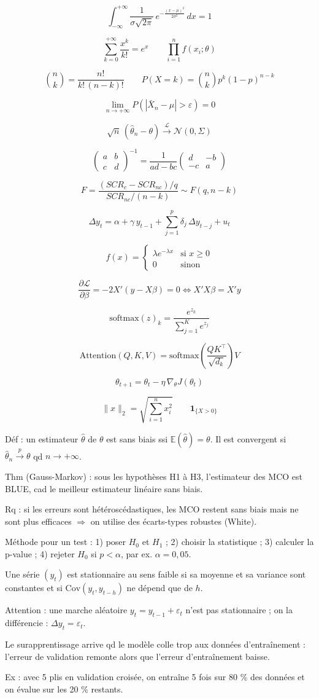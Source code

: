 \documentclass[11pt]{article}
\makeatletter
\newcommand{\aecrire}[1]{\par\noindent\begin{minipage}{\linewidth}\raggedright #1\end{minipage}\par\vspace{2pt}{\color{fiche@roseclair}\rule{\linewidth}{.6pt}}\par\vspace{5pt}}
\makeatother
\begin{document}
\aecrire{\[ \int_{-\infty}^{+\infty} \frac{1}{\sigma\sqrt{2\pi}}\, e^{-\frac{(x-\mu)^2}{2\sigma^2}}\, dx = 1 \]}
\aecrire{\[ \sum_{k=0}^{+\infty} \frac{x^k}{k!} = e^x \qquad \prod_{i=1}^{n} f(x_i ; \theta) \]}
\aecrire{\[ \binom{n}{k} = \frac{n!}{k!\,(n-k)!} \qquad P(X = k) = \binom{n}{k} p^k (1-p)^{n-k} \]}
\aecrire{\[ \lim_{n \to +\infty} P\left(|\bar{X}_n - \mu| > \varepsilon\right) = 0 \]}
\aecrire{\[ \sqrt{n}\,(\hat{\theta}_n - \theta) \xrightarrow{\mathcal{L}} \mathcal{N}(0, \Sigma) \]}
\aecrire{\[ \begin{pmatrix} a & b \\ c & d \end{pmatrix}^{-1} = \frac{1}{ad - bc} \begin{pmatrix} d & -b \\ -c & a \end{pmatrix} \]}
\aecrire{\[ F = \frac{(SCR_c - SCR_{nc})/q}{SCR_{nc}/(n-k)} \sim F(q, n-k) \]}
\aecrire{\[ \Delta y_t = \alpha + \gamma\, y_{t-1} + \sum_{j=1}^{p} \delta_j\, \Delta y_{t-j} + u_t \]}
\aecrire{\[ f(x) = \begin{cases} \lambda e^{-\lambda x} & \text{si } x \geq 0 \\ 0 & \text{sinon} \end{cases} \]}
\aecrire{\[ \frac{\partial \mathcal{L}}{\partial \beta} = -2X'(y - X\beta) = 0 \iff X'X\beta = X'y \]}
\aecrire{\[ \mathrm{softmax}(z)_k = \frac{e^{z_k}}{\sum_{j=1}^{K} e^{z_j}} \]}
\aecrire{\[ \mathrm{Attention}(Q, K, V) = \mathrm{softmax}\left(\frac{QK^{\top}}{\sqrt{d_k}}\right) V \]}
\aecrire{\[ \theta_{t+1} = \theta_t - \eta\, \nabla_{\theta} J(\theta_t) \]}
\aecrire{\[ \|x\|_2 = \sqrt{\sum_{i=1}^{n} x_i^2} \qquad \mathbf{1}_{\{X > 0\}} \]}

\clearpage
{}

\aecrire{Déf : un estimateur $\hat{\theta}$ de $\theta$ est sans biais ssi $\mathbb{E}(\hat{\theta}) = \theta$. Il est convergent si $\hat{\theta}_n \xrightarrow{p} \theta$ qd $n \to +\infty$.}
\aecrire{Thm (Gauss-Markov) : sous les hypothèses H1 à H3, l'estimateur des MCO est BLUE, cad le meilleur estimateur linéaire sans biais.}
\aecrire{Rq : si les erreurs sont hétéroscédastiques, les MCO restent sans biais mais ne sont plus efficaces $\Rightarrow$ on utilise des écarts-types robustes (White).}
\aecrire{Méthode pour un test : 1) poser $H_0$ et $H_1$ ; 2) choisir la statistique ; 3) calculer la p-value ; 4) rejeter $H_0$ si $p < \alpha$, par ex. $\alpha = 0{,}05$.}
\aecrire{Une série $(y_t)$ est stationnaire au sens faible si sa moyenne et sa variance sont constantes et si $\mathrm{Cov}(y_t, y_{t-h})$ ne dépend que de $h$.}
\aecrire{Attention : une marche aléatoire $y_t = y_{t-1} + \varepsilon_t$ n'est pas stationnaire ; on la différencie : $\Delta y_t = \varepsilon_t$.}
\aecrire{Le surapprentissage arrive qd le modèle colle trop aux données d'entraînement : l'erreur de validation remonte alors que l'erreur d'entraînement baisse.}
\aecrire{Ex : avec 5 plis en validation croisée, on entraîne 5 fois sur 80 \% des données et on évalue sur les 20 \% restants.}
\end{document}
